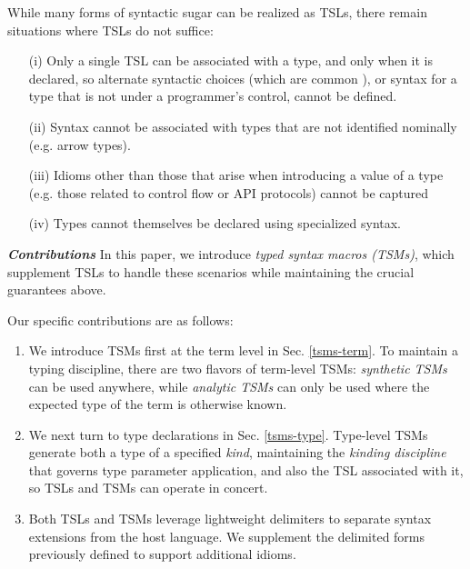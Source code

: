 \documentclass{sig-alternate}[10pt]
\begin{document}
While many forms of syntactic sugar can be realized as TSLs, there remain situations where TSLs do not suffice: 
\begin{enumerate}[noitemsep]
\item[(i)] Only a single TSL can be associated with a type, and only when it is declared, so alternate syntactic choices (which are common \cite{scaffidi2008using}), or syntax for a type that is not under a programmer's control, cannot be defined.
\item[(ii)] Syntax cannot be associated with types that are not identified nominally (e.g. arrow types).
\item[(iii)] Idioms other than those that arise when introducing a value of a type (e.g. those related to control flow or API protocols) cannot be captured
\item[(iv)] Types cannot themselves be declared using specialized syntax. 
\end{enumerate}

\noindent\textbf{\textit{Contributions}} In this paper, we introduce \emph{typed syntax macros (TSMs)}, which supplement TSLs to handle these scenarios while maintaining the crucial guarantees above. 

Our specific contributions are as follows:%
\begin{enumerate}[noitemsep]
\item We introduce TSMs first at the term level in Sec. \ref{tsms-term}.  To maintain a typing discipline, there are two flavors of term-level TSMs: \emph{synthetic TSMs} can be used anywhere, while \emph{analytic TSMs} can only be used where the expected type of the term is otherwise known. 
\item We next turn to type declarations  in Sec. \ref{tsms-type}. Type-level TSMs generate both a type of a specified \emph{kind}, maintaining the \emph{kinding discipline} that governs type parameter application, and also the TSL associated with it, so TSLs and TSMs can operate in concert. %
\item Both TSLs and TSMs leverage lightweight delimiters to separate syntax extensions from the host language. We supplement the delimited forms previously defined to support additional idioms.
\end{enumerate}
\end{document}
